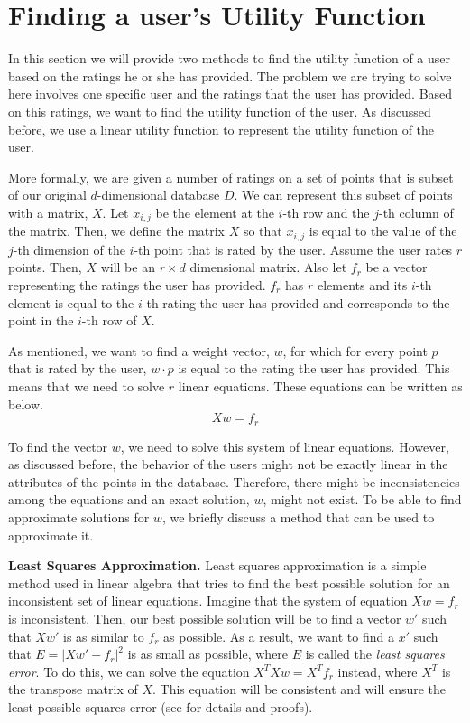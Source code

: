\section{Finding a user's Utility Function}
In this section we will provide two methods to find the utility function of a user based on the ratings he or she has provided. The problem we are trying to solve here involves one specific user and the ratings that the user has provided. Based on this ratings, we want to find the utility function of the user. As discussed before, we use a linear utility function to represent the utility function of the user. 

More formally, we are given a number of ratings on a set of points that is subset of our original $d$-dimensional database $D$. We can represent this subset of points with a matrix, $X$. Let $x_{i, j}$ be the element at the $i$-th row and the $j$-th column of the matrix. Then, we define the matrix $X$ so that $x_{i, j}$ is equal to the value of the  $j$-th dimension of the $i$-th point that is rated by the user. Assume the user rates $r$ points. Then, $X$ will be an $r \times d$ dimensional matrix. Also let $f_r$ be a vector representing the ratings the user has provided. $f_r$ has $r$ elements and its $i$-th element is equal to the $i$-th rating the user has provided and corresponds to the point in the $i$-th row of $X$. 

As mentioned, we want to find a weight vector, $w$, for which for every point $p$ that is rated by the user, $w \cdot p$ is equal to the rating the user has provided. This means that we need to solve $r$ linear equations. These equations can be written as below.
\begin{equation*}
Xw = f_r
\end{equation*}

To find the vector $w$, we need to solve this system of linear equations. However, as discussed before, the behavior of the users might not be exactly linear in the attributes of the points in the database. Therefore, there might be inconsistencies among the equations and an exact solution, $w$, might not exist. To be able to find approximate solutions for $w$, we briefly discuss a method that can be used to approximate it.


\textbf{Least Squares Approximation.}
Least squares approximation is a simple method used in linear algebra that tries to find the best possible solution for an inconsistent set of linear equations. Imagine that the system of equation $Xw = f_r$ is inconsistent. Then, our best possible solution will be to find a vector $w'$ such that $Xw'$ is as similar to $f_r$ as possible. As a result, we want to find a $x'$ such that $E = \left\vert Xw' - f_r \right\vert^2$ is as small as possible, where $E$ is called the \textit{least squares error}. To do this, we can solve the equation $X^TXw = X^Tf_r$ instead, where $X^T$ is the transpose matrix of $X$. This equation will be consistent and will ensure the least possible squares error (see \cite{linearAlgebra} for details and proofs). 

